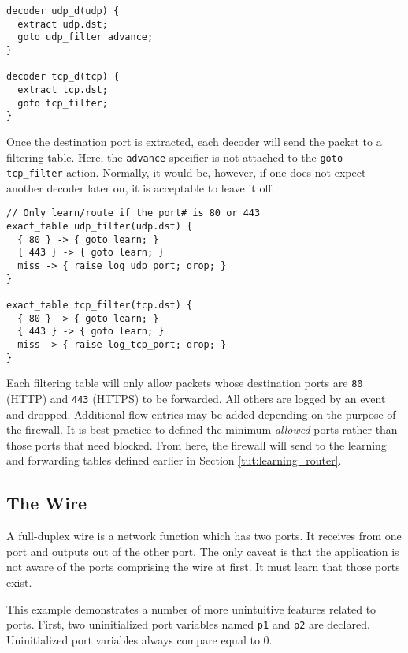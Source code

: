 \begin{codepage}
\begin{lstlisting}
decoder udp_d(udp) {
  extract udp.dst;
  goto udp_filter advance;
}

decoder tcp_d(tcp) {
  extract tcp.dst;
  goto tcp_filter;
}
\end{lstlisting}
\end{codepage}

Once the destination port is extracted, each decoder will send the packet to 
a filtering table. Here, the \texttt{advance} specifier is not attached to the 
\texttt{goto tcp\_filter} action. Normally, it would be, however, if one does 
not expect another decoder later on, it is acceptable to leave it off.

\begin{codepage}
\begin{lstlisting}
// Only learn/route if the port# is 80 or 443
exact_table udp_filter(udp.dst) {
  { 80 } -> { goto learn; }
  { 443 } -> { goto learn; }
  miss -> { raise log_udp_port; drop; }
}

exact_table tcp_filter(tcp.dst) {
  { 80 } -> { goto learn; }
  { 443 } -> { goto learn; }
  miss -> { raise log_tcp_port; drop; }
}
\end{lstlisting}
\end{codepage}

Each filtering table will only allow packets whose destination ports are \texttt{80} (HTTP) and \texttt{443} (HTTPS) to be forwarded. All others are logged by an event and dropped. Additional flow entries may be added depending on the purpose of the firewall. It is best practice to defined the minimum \textit{allowed} ports rather than those ports that need blocked. From here, the firewall will send to the learning and forwarding tables defined earlier in Section \ref{tut:learning_router}.

\subsection{The Wire} \label{tut:wire}

A full-duplex wire is a network function which has two ports. 
It receives from one port
and outputs out of the other port. The only caveat is that the application is
not aware of the ports comprising the wire at first. It must learn that those
ports exist.

This example demonstrates a number of more unintuitive features related to
ports. First, two uninitialized port variables named \texttt{p1} and
\texttt{p2} are declared. Uninitialized port variables always compare equal to 0.


